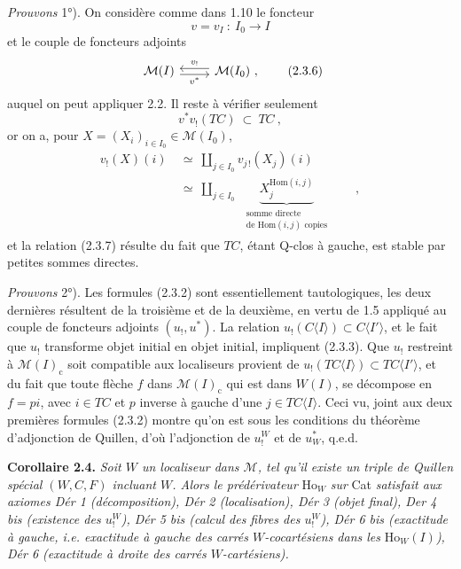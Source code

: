 \documentclass[11pt]{article}
\newcommand{\msp}[1]{\marginpar{\footnotesize [#1]}}
\newcommand{\M}{\mathcal{M}}
\newcommand{\Ho}{\mathrm{Ho}}
\newcommand{\cc}{\mathrm{c}}
\begin{document}
\textit{Prouvons} 1°). On considère comme dans 1.10 le foncteur
\[
v = v_I\ :\ I_0 \longrightarrow I
\]
et le couple de foncteurs adjoints
\[
\begin{tikzcd}
\M(I) \arrow[r, shift right, "v^*"'] & \M(I_0)\ , \arrow[l, shift right, "v_!"']
\end{tikzcd}
\tag*{(2.3.6)}
\]
auquel on peut appliquer 2.2. Il reste
\msp{page 21}
à vérifier seulement
\[
v^*v_!(TC)\ \subset\ TC\ ,
\tag*{(2.3.7)}
\]
or on a, pour $X = (X_i)_{i \in I_0} \in \M(I_0)$,
\[
\begin{aligned}
v_!(X)(i) &\ \simeq\ \textstyle\coprod_{j \in I_0} v_{j\,!}(X_j)(i)\\
&\ \simeq\ \textstyle\coprod_{j \in I_0}\ \ \underbrace{X_j^{\mathrm{Hom}(i,j)}}_{\substack{\text{somme directe}\\ \text{de }\mathrm{Hom}(i,j)\text{ copies}}}\qquad ,
\end{aligned}
\]
et la relation (2.3.7) résulte du fait que $TC$, étant Q-clos à gauche, est stable par petites sommes directes.

\textit{Prouvons} 2°). Les formules (2.3.2) sont essentiellement tautologiques, les deux dernières résultent de la troisième et de la deuxième, en vertu de 1.5 appliqué au couple de foncteurs adjoints $(u_!,u^*)$. La relation $u_!(C\langle I\rangle) \subset C\langle I'\rangle$, et le fait que $u_!$ transforme objet initial en objet initial, impliquent (2.3.3). Que $u_!$ restreint à $\M(I)_{\cc}$ soit compatible aux localiseurs provient de $u_!(TC\langle I\rangle) \subset TC\langle I'\rangle$, et du fait que toute flèche $f$ dans $\M(I)_{\cc}$ qui est dans $W(I)$, se décompose en $f = pi$, avec $i \in TC$ et $p$ inverse à gauche d'une $j \in TC\langle I\rangle$. Ceci vu, joint aux deux premières formules (2.3.2) montre qu'on est sous les conditions
\msp{page 22}
du théorème d'adjonction de Quillen, d'où l'adjonction de $u_!^W$ et de $u^*_W$, q.e.d.

\textbf{Corollaire 2.4.} \textit{Soit $W$ un localiseur dans $\M$, tel qu'il existe un triple de Quillen spécial $(W,C,F)$ incluant $W$. Alors le prédérivateur} $\Ho_W$ \textit{sur} Cat \textit{satisfait aux axiomes Dér 1 (décomposition), Dér 2 (localisation), Dér 3 (objet final), Der 4 bis (existence des $u_!^W$), Dér 5 bis (calcul des fibres des $u_!^W$), Dér 6 bis (exactitude à gauche, i.e. exactitude à gauche des carrés $W$-cocartésiens dans les} $\Ho_W(I)$\textit{), Dér 6 (exactitude à droite des carrés $W$-cartésiens).} %
\end{document}
